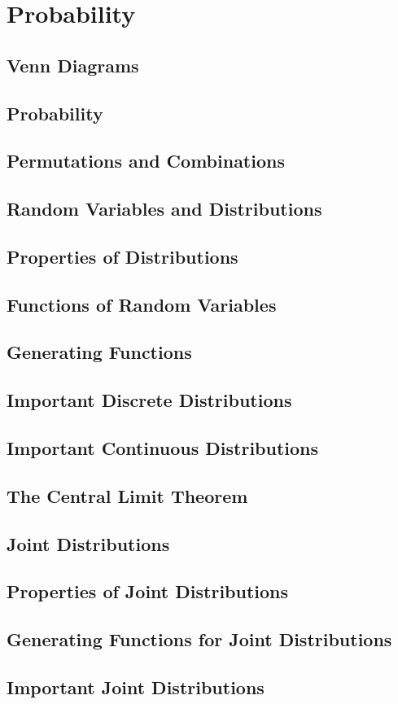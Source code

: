 \chapter{Probability}
\section{Venn Diagrams}
\section{Probability}
\section{Permutations and Combinations}
\section{Random Variables and Distributions}
\section{Properties of Distributions}
\section{Functions of Random Variables}
\section{Generating Functions}
\section{Important Discrete Distributions}
\section{Important Continuous Distributions}
\section{The Central Limit Theorem}
\section{Joint Distributions}
\section{Properties of Joint Distributions}
\section{Generating Functions for Joint Distributions}
\section{Important Joint Distributions}

